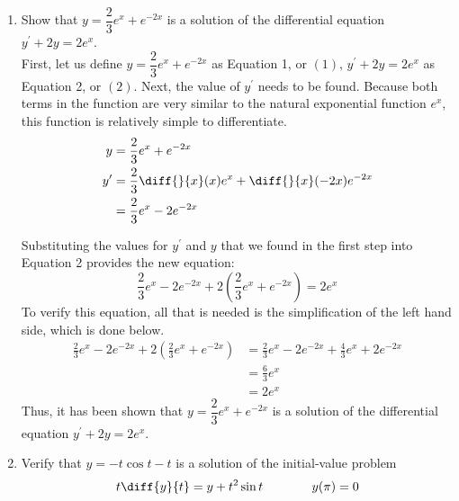 \documentclass{article}
\begin{document}
\begin{enumerate}[label=\textbf{\arabic*.}]
\item Show that $y=\dfrac{2}{3}e^x+e^{-2x}$ is a solution of the differential equation $y^\prime+2y=2e^x$.\\


\vspace{5pt}
First, let us define $y=\dfrac{2}{3}e^x+e^{-2x}$ as Equation 1, or $(1)$, $y^\prime+2y=2e^x$ as Equation 2, or $(2)$. Next, the value of $y^\prime$ needs to be found. Because both terms in the function are very similar to the natural exponential function $e^x$, this function is relatively simple to differentiate.
\begin{align*}
y &= \frac{2}{3}e^x+e^{-2x}\\
y^\prime &= \frac{2}{3}\diff{}{x}(x)e^x+\diff{ }{x}(-2x)e^{-2x}\\
&= \frac{2}{3}e^x-2e^{-2x}
\end{align*}

Substituting the values for $y^\prime$ and $y$ that we found in the first step into Equation 2 provides the new equation:
\[\frac{2}{3}e^x-2e^{-2x} + 2\left(\frac{2}{3}e^x+e^{-2x}\right) =  2e^x\] 
To verify this equation, all that is needed is the simplification of the left hand side, which is done below.
\begin{align*}
\frac{2}{3}e^x-2e^{-2x} + 2\left(\frac{2}{3}e^x+e^{-2x}\right) &= \frac{2}{3}e^x-2e^{-2x} +  \frac{4}{3}e^x+2e^{-2x}\\
&= \frac{6}{3}e^x\\
&= 2e^x
\end{align*}
Thus, it has been shown that $y=\dfrac{2}{3}e^x+e^{-2x}$ is a solution of the differential equation $y^\prime+2y=2e^x$.
\newpage

\item Verify that $y = -t\cos t - t$ is a solution of the initial-value problem 
\[t\diff{y}{t} = y+t^2\sin t \;\;\;\;\;\;\;\;\;\;\;\;\;\; y(\pi)=0\]



\end{enumerate}
\end{document}

